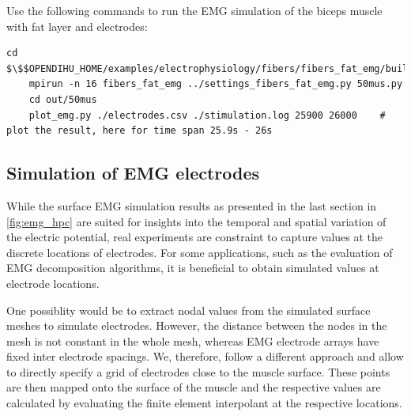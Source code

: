 %

\begin{reproduce}
  Use the following commands to run the EMG simulation of the biceps muscle with fat layer and electrodes:
  \begin{lstlisting}[columns=fullflexible,breaklines=true,postbreak=\mbox{\textcolor{gray}{$\hookrightarrow$}\space}]
    cd $\$$OPENDIHU_HOME/examples/electrophysiology/fibers/fibers_fat_emg/build_release
    mpirun -n 16 fibers_fat_emg ../settings_fibers_fat_emg.py 50mus.py
    cd out/50mus
    plot_emg.py ./electrodes.csv ./stimulation.log 25900 26000    # plot the result, here for time span 25.9s - 26s
  \end{lstlisting}
\end{reproduce}


\subsection{Simulation of EMG electrodes}

While the surface EMG simulation results as presented in the last section in \cref{fig:emg_hpc} are suited for insights into the temporal and spatial variation of the electric potential, real experiments are constraint to capture values at the discrete locations of electrodes.
For some applications, such as the evaluation of EMG decomposition algorithms, it is beneficial to obtain simulated values at electrode locations.

One possiblity would be to extract nodal values from the simulated surface meshes to simulate electrodes. However, the distance between the nodes in the mesh is not constant in the whole mesh, whereas EMG electrode arrays have fixed inter electrode spacings. We, therefore, follow a different approach and allow to directly specify a grid of electrodes close to the muscle surface. These points are then mapped onto the surface of the muscle and the respective values are calculated by evaluating the finite element interpolant at the respective locations.

